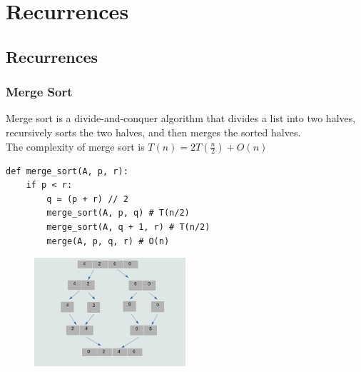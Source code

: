 \chapter{Recurrences}

\section{Recurrences}

\subsection{Merge Sort}
\begin{definition}
    \label{def:merge_sort}
    Merge sort is a divide-and-conquer algorithm that divides a list into two halves, recursively sorts the two halves, and then merges the sorted halves.\\
    The complexity of merge sort is $T(n) = 2T\left(\frac{n}{2}\right) + O(n)$
\end{definition}

\begin{verbatim}
def merge_sort(A, p, r):
    if p < r:
        q = (p + r) // 2
        merge_sort(A, p, q) # T(n/2)
        merge_sort(A, q + 1, r) # T(n/2)
        merge(A, p, q, r) # O(n)
\end{verbatim}

\begin{figure}
    \centering
    \includegraphics[width=0.5\textwidth]{./LECTURE_4/merge-sort.png}
\end{figure}


